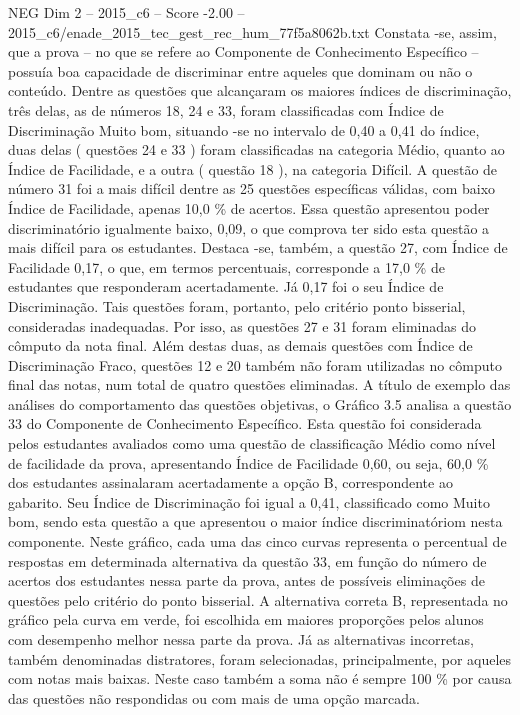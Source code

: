 \begin{textsample}{NEG Dim 2 – 2015\_c6 – Score -2.00 – 2015\_c6/enade\_2015\_tec\_gest\_rec\_hum\_77f5a8062b.txt}
Constata -se, assim, que a prova – no que se refere ao Componente de Conhecimento Específico – possuía boa capacidade de discriminar entre aqueles que dominam ou não o conteúdo.
Dentre as questões que alcançaram os maiores índices de discriminação, três delas, as de números 18, 24 e 33, foram classificadas com Índice de Discriminação Muito bom, situando -se no intervalo de 0,40 a 0,41 do índice, duas delas ( questões 24 e 33 ) foram classificadas na categoria Médio, quanto ao Índice de Facilidade, e a outra ( questão 18 ), na categoria Difícil.
A questão de número 31 foi a mais difícil dentre as 25 questões específicas válidas, com baixo Índice de Facilidade, apenas 10,0 \% de acertos.
Essa questão apresentou poder discriminatório igualmente baixo, 0,09, o que comprova ter sido esta questão a mais difícil para os estudantes.
Destaca -se, também, a questão 27, com Índice de Facilidade 0,17, o que, em termos percentuais, corresponde a 17,0 \% de estudantes que responderam acertadamente.
Já 0,17 foi o seu Índice de Discriminação.
Tais questões foram, portanto, pelo critério ponto bisserial, consideradas inadequadas.
Por isso, as questões 27 e 31 foram eliminadas do cômputo da nota final.
Além destas duas, as demais questões com Índice de Discriminação Fraco, questões 12 e 20 também não foram utilizadas no cômputo final das notas, num total de quatro questões eliminadas.
A título de exemplo das análises do comportamento das questões objetivas, o Gráfico 3.5 analisa a questão 33 do Componente de Conhecimento Específico.
Esta questão foi considerada pelos estudantes avaliados como uma questão de classificação Médio como nível de facilidade da prova, apresentando Índice de Facilidade 0,60, ou seja, 60,0 \% dos estudantes assinalaram acertadamente a opção B, correspondente ao gabarito.
Seu Índice de Discriminação foi igual a 0,41, classificado como Muito bom, sendo esta questão a que apresentou o maior índice discriminatóriom nesta componente.
Neste gráfico, cada uma das cinco curvas representa o percentual de respostas em determinada alternativa da questão 33, em função do número de acertos dos estudantes nessa parte da prova, antes de possíveis eliminações de questões pelo critério do ponto bisserial.
A alternativa correta B, representada no gráfico pela curva em verde, foi escolhida em maiores proporções pelos alunos com desempenho melhor nessa parte da prova.
Já as alternativas incorretas, também denominadas distratores, foram selecionadas, principalmente, por aqueles com notas mais baixas.
Neste caso também a soma não é sempre 100 \% por causa das questões não respondidas ou com mais de uma opção marcada.

\end{textsample}
